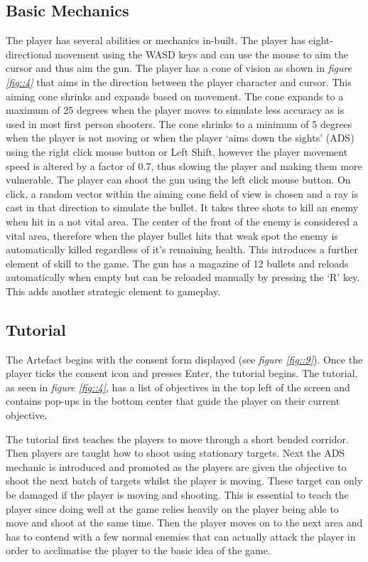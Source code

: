 \documentclass[journal]{IEEEtran}
\begin{document}
\subsection{Basic Mechanics}
The player has several abilities or mechanics in-built. The player has eight-directional movement using the WASD keys and can use the mouse to aim the cursor and thus aim the gun. 
The player has a cone of vision as shown in \textit{figure \ref{fig::4}} that aims in the direction between the player character and cursor. This aiming cone shrinks and expands based on movement. The cone expands to a maximum of 25 degrees when the player moves to simulate less accuracy as is used in most first person shooters. The cone shrinks to a minimum of 5 degrees when the player is not moving or when the player `aims down the sights' (ADS) using the right click mouse button or Left Shift, however the player movement speed is altered by a factor of 0.7, thus slowing the player and making them more vulnerable. 
The player can shoot the gun using the left click mouse button. On click, a random vector within the aiming cone field of view is chosen and a ray is cast in that direction to simulate the bullet. It takes three shots to kill an enemy when hit in a not vital area. The center of the front of the enemy is considered a vital area, therefore when the player bullet hits that weak spot the enemy is automatically killed regardless of it's remaining health. This introduces a further element of skill to the game.
The gun has a magazine of 12 bullets and reloads automatically when empty but can be reloaded manually by pressing the `R' key. This adds another strategic element to gameplay.

\subsection{Tutorial}
The Artefact begins with the consent form displayed (see \textit{figure \ref{fig::9}}). Once the player ticks the consent icon and presses Enter, the tutorial begins. The tutorial, as seen in \textit{figure \ref{fig::4}}, has a list of objectives in the top left of the screen and contains pop-ups in the bottom center that guide the player on their current objective. 

The tutorial first teaches the players to move through a short bended corridor. Then players are taught how to shoot using stationary targets. Next the ADS mechanic is introduced and promoted as the players are given the objective to shoot the next batch of targets whilst the player is moving. These target can only be damaged if the player is moving and shooting. This is essential to teach the player since doing well at the game relies heavily on the player being able to move and shoot at the same time. Then the player moves on to the next area and has to contend with a few normal enemies that can actually attack the player in order to acclimatise the player to the basic idea of the game.
\end{document}
